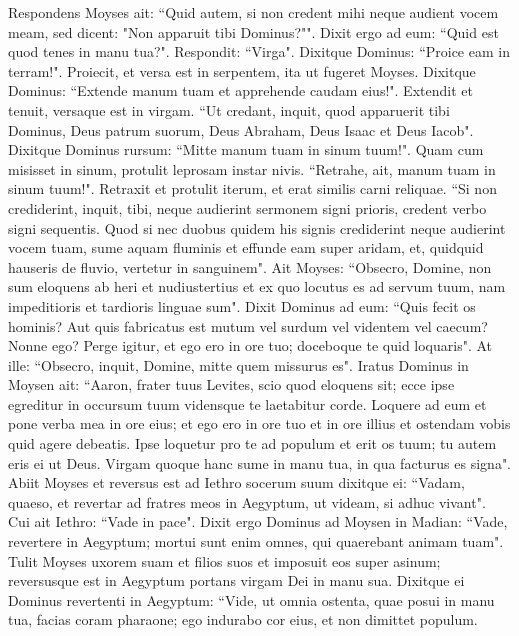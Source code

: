 \begin{biblechapter}  
\verse Respondens Moyses ait: “Quid autem, si non credent mihi neque audient vocem meam, sed dicent: "Non apparuit tibi Dominus?"". 
\verse Dixit ergo ad eum: “Quid est quod tenes in manu tua?". Respondit: “Virga". 
\verse Dixitque Dominus: “Proice eam in terram!". Proiecit, et versa est in serpentem, ita ut fugeret Moyses. 
\verse Dixitque Dominus: “Extende manum tuam et apprehende caudam eius!". Extendit et tenuit, versaque est in virgam. 
\verse “Ut credant, inquit, quod apparuerit tibi Dominus, Deus patrum suorum, Deus Abraham, Deus Isaac et Deus Iacob". 
\verse Dixitque Dominus rursum: “Mitte manum tuam in sinum tuum!". Quam cum misisset in sinum, protulit leprosam instar nivis. 
\verse “Retrahe, ait, manum tuam in sinum tuum!". Retraxit et protulit iterum, et erat similis carni reliquae. 
\verse “Si non crediderint, inquit, tibi, neque audierint sermonem signi prioris, credent verbo signi sequentis. 
\verse Quod si nec duobus quidem his signis crediderint neque audierint vocem tuam, sume aquam fluminis et effunde eam super aridam, et, quidquid hauseris de fluvio, vertetur in sanguinem". 
\verse Ait Moyses: “Obsecro, Domine, non sum eloquens ab heri et nudiustertius et ex quo locutus es ad servum tuum, nam impeditioris et tardioris linguae sum". 
\verse Dixit Dominus ad eum: “Quis fecit os hominis? Aut quis fabricatus est mutum vel surdum vel videntem vel caecum? Nonne ego? 
\verse Perge igitur, et ego ero in ore tuo; doceboque te quid loquaris". 
\verse At ille: “Obsecro, inquit, Domine, mitte quem missurus es". 
\verse Iratus Dominus in Moysen ait: “Aaron, frater tuus Levites, scio quod eloquens sit; ecce ipse egreditur in occursum tuum vidensque te laetabitur corde. 
\verse Loquere ad eum et pone verba mea in ore eius; et ego ero in ore tuo et in ore illius et ostendam vobis quid agere debeatis. 
\verse Ipse loquetur pro te ad populum et erit os tuum; tu autem eris ei ut Deus. 
\verse Virgam quoque hanc sume in manu tua, in qua facturus es signa". 
\verse Abiit Moyses et reversus est ad Iethro socerum suum dixitque ei: “Vadam, quaeso, et revertar ad fratres meos in Aegyptum, ut videam, si adhuc vivant". Cui ait Iethro: “Vade in pace". 
\verse Dixit ergo Dominus ad Moysen in Madian: “Vade, revertere in Aegyptum; mortui sunt enim omnes, qui quaerebant animam tuam". 
\verse Tulit Moyses uxorem suam et filios suos et imposuit eos super asinum; reversusque est in Aegyptum portans virgam Dei in manu sua. 
\verse Dixitque ei Dominus revertenti in Aegyptum: “Vide, ut omnia ostenta, quae posui in manu tua, facias coram pharaone; ego indurabo cor eius, et non dimittet populum. 

\end{biblechapter}
